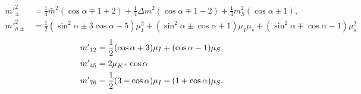 %
\begin{align}
    {m'}_\pm^2
    & =
    \frac{1}{4}\bar m^2 (\cos\alpha \mp 1 + 2)
    + \frac{1}{4} \Delta m^2 (\cos\alpha \mp 1-2)
    +\frac{1}{4} m_S^2 (\cos\alpha \pm 1), \\
    {m'}_{\mu\pm}^2
    & =
    \frac{1}{2}(\sin^2\alpha  \pm 3\cos\alpha - 5)\mu_I^2
    +(\sin^2\alpha\pm\cos\alpha + 1)\mu_I\mu_s
    +(\sin^2\alpha\mp\cos\alpha - 1)\mu_s^2
\end{align}
%
\begin{align}
    {m'}_{12} &= \frac{1}{2}(\cos\alpha + 3)\mu_I + (\cos\alpha - 1)\mu_S \\
    {m'}_{45} &= 2\mu_{K^\pm}\cos\alpha \\
    {m'}_{76} &= \frac{1}{2}(3-\cos\alpha) \mu_I - (1 + \cos\alpha)\mu_S.
\end{align}

